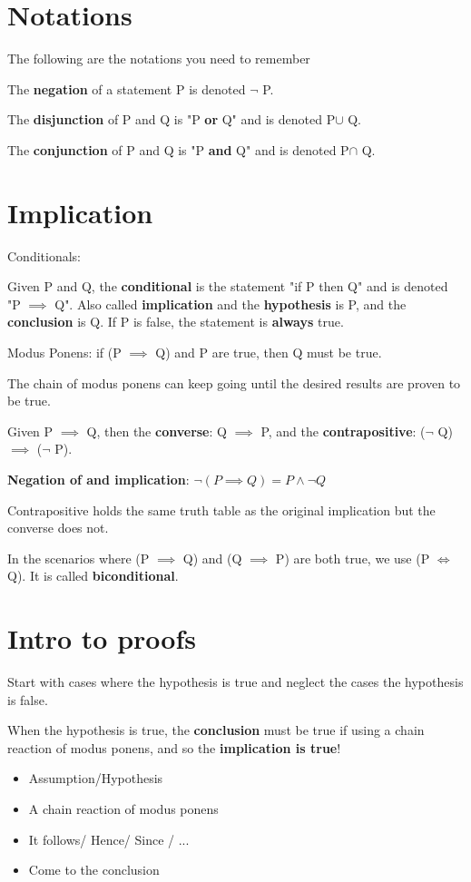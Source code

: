 \documentclass[letterpaper,12pt]{article}
\begin{document}
\section{Notations}
The following are the notations you need to remember

The \textbf{negation} of a statement P is denoted $\neg$ P.  

The \textbf{disjunction} of P and Q is "P \textbf{or} Q" and is denoted P$\cup$ Q. 

The \textbf{conjunction} of P and Q is "P \textbf{and} Q" and is denoted P$\cap$ Q.

\section{Implication}
Conditionals:

Given P and Q, the \textbf{conditional} is the statement "if P then Q" and is denoted "P $\implies$ Q". Also called \textbf{implication} and the \textbf{hypothesis} is P, and the \textbf{conclusion} is Q. If P is false, the statement is \textbf{always} true.

Modus Ponens: if (P $\implies$ Q) and P are true, then Q must be true.

The chain of modus ponens can keep going until the desired results are proven to be true.

Given P $\implies$ Q, then the \textbf{converse}: Q $\implies$ P, and the \textbf{contrapositive}: ($\neg$ Q) $\implies$ ($\neg$ P).

\textbf{Negation of and implication}: $\neg(P\implies Q)=P\land \neg Q$

Contrapositive holds the same truth table as the original implication but the converse does not. 

In the scenarios where (P $\implies$ Q) and (Q $\implies$ P) are both true, we use (P $\iff$ Q). It is called \textbf{biconditional}.



\section{Intro to proofs}

Start with cases where the hypothesis is true and neglect the cases the hypothesis is false. 

When the hypothesis is true, the \textbf{conclusion} must be true if using a chain reaction of modus ponens, and so the \textbf{implication is true}!
\begin{itemize}
    \item Assumption/Hypothesis
    \item A chain reaction of modus ponens
    \item It follows/ Hence/ Since / ...
    \item Come to the conclusion
\end{itemize}
\end{document}
